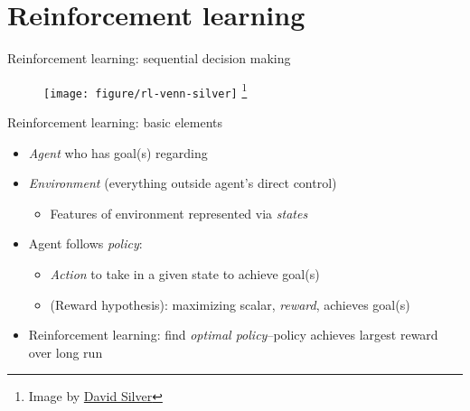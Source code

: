 \documentclass{beamer}
\newcommand\blfootnote[1]{%
  \begingroup
  \renewcommand\thefootnote{}\footnote{#1}%
  \addtocounter{footnote}{-1}%
  \endgroup
}
\begin{document}
\section{Reinforcement learning} %
\label{sec:reinforcement_learning}

\begin{frame}[c]{Reinforcement learning: sequential decision making}
  \begin{figure}
    \centering
    \texttt{[image: figure/rl-venn-silver]}
    \blfootnote{\scriptsize Image by \href{http://www0.cs.ucl.ac.uk/staff/D.Silver/web/Teaching.html}{David Silver}}
  \end{figure}
\end{frame}

\begin{frame}[c]{Reinforcement learning: basic elements}

\begin{itemize}[<+->]
  \item \emph{Agent} who has goal(s) regarding
  \item \emph{Environment} (everything outside agent's direct control)
  \begin{itemize}
    \item Features of environment represented via \emph{states}
  \end{itemize}
  \item Agent follows \emph{policy}: 
  \begin{itemize}
    \item \emph{Action} to take in a given state to achieve goal(s)
    \item (Reward hypothesis): maximizing scalar, \emph{reward}, achieves goal(s) 
  \end{itemize}
  \item Reinforcement learning: find \emph{optimal policy}--policy achieves largest reward over long run 
\end{itemize}

\end{frame}
\end{document}
